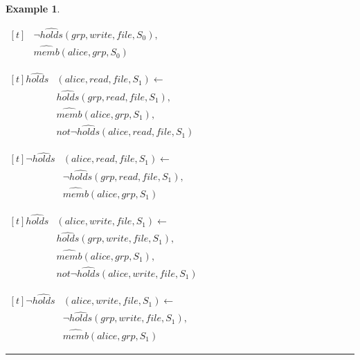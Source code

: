 \documentclass[10pt, twocolumn]{article}
\newtheorem{examp}{Example}
\newenvironment{example}{\begin{examp}\rm}{\rule{2mm}{2mm}\end{examp}}
\begin{document}
\begin{example}
\begin{list}{}{Inheritance Rules}
\begin{math}
\begin{aligned}[t]
                    & \lnot \hat{holds}(grp, write, file, S_{0}), \\
                    & \hat{memb}(alice, grp, S_{0})
                  \end{aligned}
              \end{math}
            \item
              \begin{math}
                  \begin{aligned}[t]
                    \hat{holds}&(alice, read, file, S_{1}) \leftarrow \\
                    & \hat{holds}(grp, read, file, S_{1}), \\
                    & \hat{memb}(alice, grp, S_{1}), \\
                    & not \lnot \hat{holds}(alice, read, file, S_{1})
                  \end{aligned}
              \end{math}
            \item
              \begin{math}
                  \begin{aligned}[t]
                    \lnot \hat{holds}&(alice, read, file, S_{1}) \leftarrow \\
                    & \lnot \hat{holds}(grp, read, file, S_{1}), \\
                    & \hat{memb}(alice, grp, S_{1})
                  \end{aligned}
              \end{math}
            \item
              \begin{math}
                  \begin{aligned}[t]
                    \hat{holds}&(alice, write, file, S_{1}) \leftarrow \\
                    & \hat{holds}(grp, write, file, S_{1}), \\
                    & \hat{memb}(alice, grp, S_{1}), \\
                    & not \lnot \hat{holds}(alice, write, file, S_{1})
                  \end{aligned}
              \end{math}
            \item
              \begin{math}
                  \begin{aligned}[t]
                    \lnot \hat{holds}&(alice, write, file, S_{1}) \leftarrow \\
                    & \lnot \hat{holds}(grp, write, file, S_{1}), \\
                    & \hat{memb}(alice, grp, S_{1})
                  \end{aligned}
              \end{math}
          \end{list}


\end{example}
\end{document}
